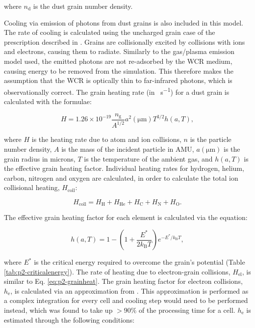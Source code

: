 \documentclass[fleqn,usenatbib]{mnras}
\newcommand{\rms}[1]{\ensuremath{_{\text{#1}}}}
\begin{document}
\noindent
where $n\rms{d}$ is the dust grain number density.

Cooling via emission of photons from dust grains is also included in this model.
The rate of cooling is calculated using the uncharged grain case of the prescription described in \citep{dwek_infrared_1981}.
Grains are collisionally excited by collisions with ions and electrons, causing them to radiate.
Similarly to the gas/plasma emission model used, the emitted photons are not re-adsorbed by the WCR medium, causing energy to be removed from the simulation.
This therefore makes the assumption that the WCR is optically thin to far-infrared photons, which is observationally correct.
The grain heating rate (in \si{\erg\per\second}) for a dust grain is calculated with the formulae:

\begin{equation}
  \label{eq:p2-grainheat}
  H = 1.26 \times 10^{-19} \frac{n\rms{g}}{A^{1/2}} a^2(\si{\micro\metre}) T^{3/2} h(a,T) , 
\end{equation}

\noindent
where $H$ is the heating rate due to atom and ion collisions, 
$n$ is the particle number density,
$A$ is the mass of the incident particle in AMU,
$a(\si{\micro\metre})$ is the grain radius in microns,
$T$ is the temperature of the ambient gas,
and $h(a,T)$ is the effective grain heating factor.
Individual heating rates for hydrogen, helium, carbon, nitrogen and oxygen are calculated, in order to calculate the total ion collisional heating, $H\rms{coll}$:

\begin{equation}
  H\rms{coll} = H\rms H + H \rms{He} + H\rms C + H\rms N + H\rms O .
\end{equation}

\noindent
The effective grain heating factor for each element is calculated via the equation:

\begin{equation}
  h(a,T) = 1 - \left( 1 + \frac{E^*}{2 k\rms{B} T} \right) e^{- E^* / k\rms{B} T} ,
\end{equation}

\noindent
where $E^*$ is the critical energy required to overcome the grain's potential (Table \ref{tab:p2-criticalenergy}).
The rate of heating due to electron-grain collisions, $H\rms{el}$, is similar to Eq. \ref{eq:p2-grainheat}.
The grain heating factor for electron collisions, $h\rms{e}$, is calculated via an approximation from \cite{dwek_infrared_1981}.
This approximation is performed as a complex integration for every cell and cooling step would need to be performed instead, which was found to take up $>90\%$ of the processing time for a cell.
$h\rms{e}$ is estimated through the following conditions:
\end{document}
